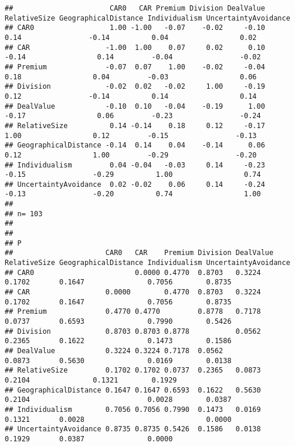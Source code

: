 \documentclass[]{article}
\begin{document}
\begin{verbatim}
##                       CAR0   CAR Premium Division DealValue RelativeSize GeographicalDistance Individualism UncertaintyAvoidance
## CAR0                  1.00 -1.00   -0.07    -0.02     -0.10         0.14                -0.14          0.04                 0.02
## CAR                  -1.00  1.00    0.07     0.02      0.10        -0.14                 0.14         -0.04                -0.02
## Premium              -0.07  0.07    1.00    -0.02     -0.04         0.18                 0.04         -0.03                 0.06
## Division             -0.02  0.02   -0.02     1.00     -0.19         0.12                -0.14          0.14                 0.14
## DealValue            -0.10  0.10   -0.04    -0.19      1.00        -0.17                 0.06         -0.23                -0.24
## RelativeSize          0.14 -0.14    0.18     0.12     -0.17         1.00                 0.12         -0.15                -0.13
## GeographicalDistance -0.14  0.14    0.04    -0.14      0.06         0.12                 1.00         -0.29                -0.20
## Individualism         0.04 -0.04   -0.03     0.14     -0.23        -0.15                -0.29          1.00                 0.74
## UncertaintyAvoidance  0.02 -0.02    0.06     0.14     -0.24        -0.13                -0.20          0.74                 1.00
## 
## n= 103 
## 
## 
## P
##                      CAR0   CAR    Premium Division DealValue RelativeSize GeographicalDistance Individualism UncertaintyAvoidance
## CAR0                        0.0000 0.4770  0.8703   0.3224    0.1702       0.1647               0.7056        0.8735              
## CAR                  0.0000        0.4770  0.8703   0.3224    0.1702       0.1647               0.7056        0.8735              
## Premium              0.4770 0.4770         0.8778   0.7178    0.0737       0.6593               0.7990        0.5426              
## Division             0.8703 0.8703 0.8778           0.0562    0.2365       0.1622               0.1473        0.1586              
## DealValue            0.3224 0.3224 0.7178  0.0562             0.0873       0.5630               0.0169        0.0138              
## RelativeSize         0.1702 0.1702 0.0737  0.2365   0.0873                 0.2104               0.1321        0.1929              
## GeographicalDistance 0.1647 0.1647 0.6593  0.1622   0.5630    0.2104                            0.0028        0.0387              
## Individualism        0.7056 0.7056 0.7990  0.1473   0.0169    0.1321       0.0028                             0.0000              
## UncertaintyAvoidance 0.8735 0.8735 0.5426  0.1586   0.0138    0.1929       0.0387               0.0000
\end{verbatim}
\end{document}
